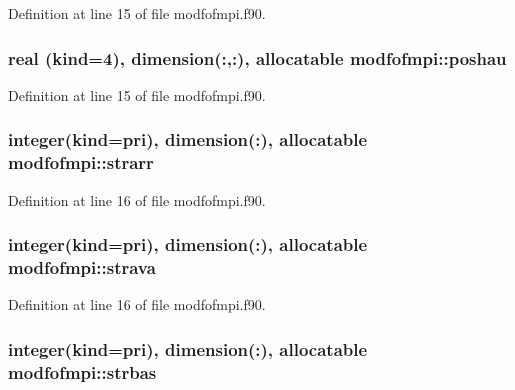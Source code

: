 Definition at line 15 of file modfofmpi.\+f90.

\subsubsection[{\texorpdfstring{poshau}{poshau}}]{\setlength{\rightskip}{0pt plus 5cm}real (kind=4), dimension(\+:,\+:), allocatable modfofmpi\+::poshau}\hypertarget{namespacemodfofmpi_a940b15087397a154e933785ff862d1aa}{}\label{namespacemodfofmpi_a940b15087397a154e933785ff862d1aa}


Definition at line 15 of file modfofmpi.\+f90.

\subsubsection[{\texorpdfstring{strarr}{strarr}}]{\setlength{\rightskip}{0pt plus 5cm}integer(kind=pri), dimension(\+:), allocatable modfofmpi\+::strarr}\hypertarget{namespacemodfofmpi_adc11b8c24e402c222ddf9d339aece63c}{}\label{namespacemodfofmpi_adc11b8c24e402c222ddf9d339aece63c}


Definition at line 16 of file modfofmpi.\+f90.

\subsubsection[{\texorpdfstring{strava}{strava}}]{\setlength{\rightskip}{0pt plus 5cm}integer(kind=pri), dimension(\+:), allocatable modfofmpi\+::strava}\hypertarget{namespacemodfofmpi_a2cc07767e1b2a2462fc2eeaaef5f5b0a}{}\label{namespacemodfofmpi_a2cc07767e1b2a2462fc2eeaaef5f5b0a}


Definition at line 16 of file modfofmpi.\+f90.

\subsubsection[{\texorpdfstring{strbas}{strbas}}]{\setlength{\rightskip}{0pt plus 5cm}integer(kind=pri), dimension(\+:), allocatable modfofmpi\+::strbas}\hypertarget{namespacemodfofmpi_a18f63a61d3cf10a560030f18385646d6}{}\label{namespacemodfofmpi_a18f63a61d3cf10a560030f18385646d6}


